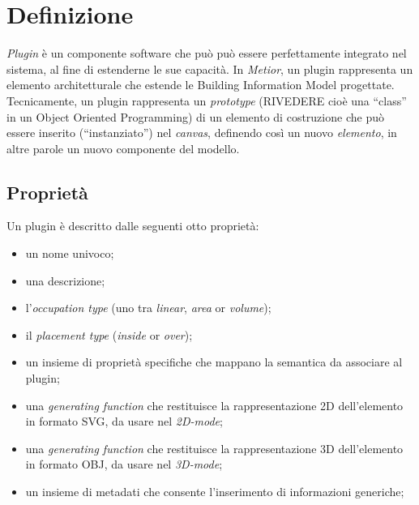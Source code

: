 \section{Definizione}
\label{sec:chapter_3_section_1}

\emph{Plugin} \`e un componente software che pu\`o può essere perfettamente integrato nel sistema, al fine di estenderne le sue capacit\`a.
In \emph{Metior}, un plugin rappresenta un elemento architetturale che estende le Building Information Model progettate.
Tecnicamente, un plugin rappresenta un \emph{prototype} (RIVEDERE cioè una ``class'' in un Object Oriented Programming) di un elemento di
costruzione che può essere inserito (``instanziato'') nel \emph{canvas}, definendo cos\`i un nuovo \emph{elemento},
in altre parole un nuovo componente del modello.
\newpage


\subsection*{Proprietà}

\noindent
Un plugin \`e descritto dalle seguenti otto propriet\`a:
\begin{itemize}
  \item un nome univoco;
  \item una descrizione;
  \item l'\emph{occupation type} (uno tra \emph{linear}, \emph{area} or \emph{volume});
  \item il \emph{placement type} (\emph{inside} or \emph{over});
  \item un insieme di proprietà specifiche che mappano la semantica da associare al plugin;
  \item  una \emph{generating function} che restituisce la rappresentazione 2D dell'elemento in formato SVG, da usare nel \emph{2D-mode};
  \item  una \emph{generating function} che restituisce la rappresentazione 3D dell'elemento in formato OBJ, da usare nel  \emph{3D-mode};
  \item un insieme di metadati che consente l'inserimento di informazioni generiche;
\end{itemize}

